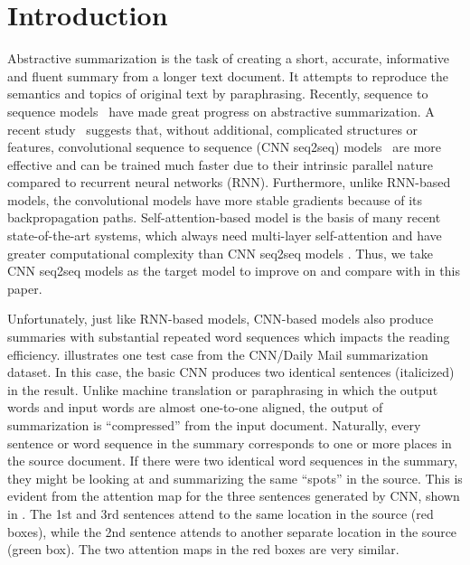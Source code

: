 \section{Introduction}
\label{sec:intro}

Abstractive summarization is the task of creating a short, accurate,
informative and fluent summary from a longer text document.
It attempts to reproduce the semantics and topics of original text
by paraphrasing. 
Recently, sequence to sequence
models~\citep{RushCW15,ChopraAR16,NallapatiZSGX16,SeeLM17,PaulusXS17}
have made great progress on abstractive summarization.
A recent study~\citep{bai2018empirical} suggests that, 
without additional, complicated structures or features,
convolutional sequence to sequence 
(CNN seq2seq) models~\citep{gehring2017convs2s,FanGA18,LiuLZ18} 
are more effective and can be trained much faster due to 
their intrinsic parallel nature compared to recurrent neural networks (RNN).
Furthermore, unlike RNN-based models, 
the convolutional models have more stable gradients 
because of its backpropagation paths. 
Self-attention-based model is 
the basis of many recent state-of-the-art systems,
which always need multi-layer self-attention and have greater computational complexity than CNN seq2seq models \citep{CompareTrans}.
Thus, we take CNN seq2seq models as the target model to improve on and
compare with in this paper.

Unfortunately, just like RNN-based models, CNN-based models also produce
summaries with substantial repeated word sequences which impacts the reading efficiency.
 illustrates one 
test case from the CNN/Daily Mail summarization dataset. 
In this case, the basic CNN produces two 
identical sentences (italicized) in the result. 
Unlike machine translation or paraphrasing in which the output words
and input words are almost one-to-one aligned, the output of summarization
is ``compressed'' from the input document. Naturally, every sentence or 
word sequence in the summary corresponds to one or more places in the source
document. If there were two identical word sequences in the summary,
they might be looking at and summarizing the same ``spots'' in the source.
This is evident from the attention map for the three sentences generated by 
CNN, shown in . The 1st and 3rd sentences attend to
the same location in the source (red boxes), 
while the 2nd sentence attends to another separate location in the source (green box). 
The two attention maps in the red boxes are very similar.

